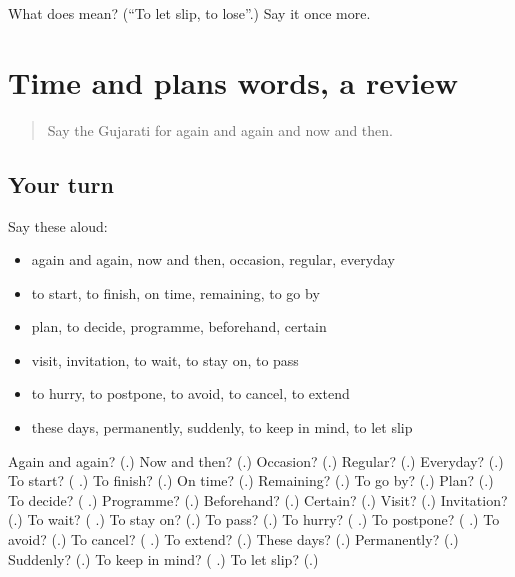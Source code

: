 \begin{tcolorbox}[breakable,colback=teal!4,colframe=teal!35!black,title={Before you move on}]
What does  mean? (\textquotedblleft{}To let slip, to lose\textquotedblright{}.) Say it once more.
\end{tcolorbox}
\section[(dialogue)]{Time and plans words, a review}

\label{lesson:GU-R182-review-177-182}



\begin{quote}
Say the Gujarati for again and again and now and then.
\end{quote}

\subsection*{Your turn}
Say these aloud:

\begin{itemize}
\raggedright
  \item again and again, now and then, occasion, regular, everyday
  \item to start, to finish, on time, remaining, to go by
  \item plan, to decide, programme, beforehand, certain
  \item visit, invitation, to wait, to stay on, to pass
  \item to hurry, to postpone, to avoid, to cancel, to extend
  \item these days, permanently, suddenly, to keep in mind, to let slip
\end{itemize}

\begin{tcolorbox}[breakable,colback=teal!4,colframe=teal!35!black,title={Before you move on}]
Again and again? (\textbf{}.) Now and then? (\textbf{}.) Occasion? (\textbf{}.) Regular? (\textbf{}.) Everyday? (\textbf{}.) To start? (\textbf{ }.) To finish? (\textbf{}.) On time? (\textbf{}.) Remaining? (\textbf{}.) To go by? (\textbf{}.) Plan? (\textbf{}.) To decide? (\textbf{ }.) Programme? (\textbf{}.) Beforehand? (\textbf{}.) Certain? (\textbf{}.) Visit? (\textbf{}.) Invitation? (\textbf{}.) To wait? (\textbf{ }.) To stay on? (\textbf{}.) To pass? (\textbf{}.) To hurry? (\textbf{ }.) To postpone? (\textbf{ }.) To avoid? (\textbf{}.) To cancel? (\textbf{ }.) To extend? (\textbf{}.) These days? (\textbf{}.) Permanently? (\textbf{}.) Suddenly? (\textbf{}.) To keep in mind? (\textbf{ }.) To let slip? (\textbf{}.)
\end{tcolorbox}
